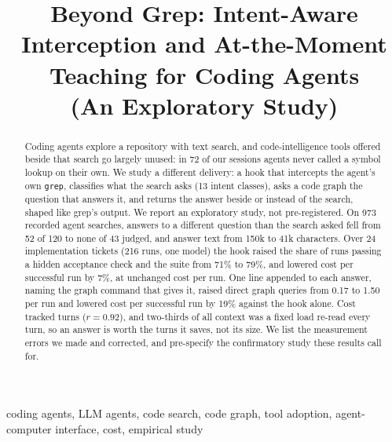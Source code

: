 \documentclass[conference]{IEEEtran}
\newif\ifanon
\begin{document}
\title{Beyond Grep: Intent-Aware Interception and At-the-Moment Teaching for Coding Agents\\(An Exploratory Study)}

\ifanon
\author{\IEEEauthorblockN{Anonymous author(s)}\IEEEauthorblockA{Anonymous institution}}
\else
\author{}
\fi

\maketitle

\begin{abstract}
Coding agents explore a repository with text search, and code-intelligence tools offered beside that search go largely
unused: in 72 of our sessions agents never called a symbol lookup on their own. We study a different delivery: a hook
that intercepts the agent's own \texttt{grep}, classifies what the search asks (13 intent classes), asks a code graph
the question that answers it, and returns the answer beside or instead of the search, shaped like grep's output. We
report an exploratory study, not pre-registered. On 973 recorded agent searches, answers to a different question than
the search asked fell from 52 of 120 to none of 43 judged, and answer text from 150k to 41k characters. Over 24
implementation tickets (216 runs, one model) the hook raised the share of runs passing a hidden acceptance check and the
suite from 71\% to 79\%, and lowered cost per successful run by 7\%, at unchanged cost per run. One line appended to each
answer, naming the graph command that gives it, raised direct graph queries from 0.17 to 1.50 per run and lowered cost
per successful run by 19\% against the hook alone. Cost tracked turns ($r=0.92$), and two-thirds of all context was a
fixed load re-read every turn, so an answer is worth the turns it saves, not its size. We list the measurement errors we
made and corrected, and pre-specify the confirmatory study these results call for.
\end{abstract}

\begin{IEEEkeywords}
coding agents, LLM agents, code search, code graph, tool adoption, agent-computer interface, cost, empirical study
\end{IEEEkeywords}
\end{document}
